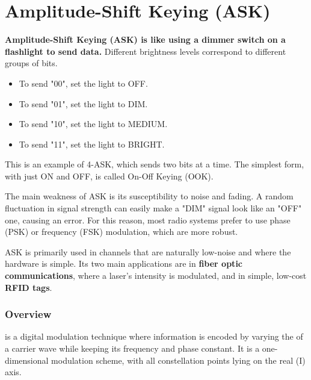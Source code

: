 
\chapter{Amplitude-Shift Keying (ASK)}
\label{ch:ask}

\begin{nontechnical}
    \textbf{Amplitude-Shift Keying (ASK) is like using a dimmer switch on a flashlight to send data.} Different brightness levels correspond to different groups of bits.

    \begin{itemize}
        \item To send "00", set the light to OFF.
        \item To send "01", set the light to DIM.
        \item To send "10", set the light to MEDIUM.
        \item To send "11", set the light to BRIGHT.
    \end{itemize}
    This is an example of 4-ASK, which sends two bits at a time. The simplest form, with just ON and OFF, is called On-Off Keying (OOK).

     The main weakness of ASK is its susceptibility to noise and fading. A random fluctuation in signal strength can easily make a "DIM" signal look like an "OFF" one, causing an error. For this reason, most radio systems prefer to use phase (PSK) or frequency (FSK) modulation, which are more robust.

     ASK is primarily used in channels that are naturally low-noise and where the hardware is simple. Its two main applications are in \textbf{fiber optic communications}, where a laser's intensity is modulated, and in simple, low-cost \textbf{RFID tags}.
\end{nontechnical}


\subsection{Overview}

 is a digital modulation technique where information is encoded by varying the  of a carrier wave while keeping its frequency and phase constant. It is a one-dimensional modulation scheme, with all constellation points lying on the real (I) axis.

